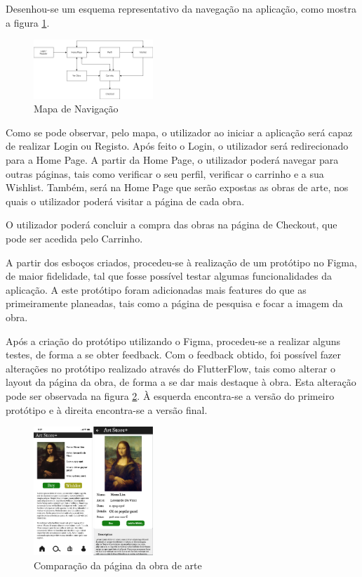 \documentclass[conference]{IEEEtran}
\begin{document}
Desenhou-se um esquema representativo da navegação na aplicação, como mostra a figura \ref{fig:navmap}.

\begin{figure}[ht]
    \centering
    \includegraphics[width=0.4\textwidth]{artstore+map.drawio.png}
    \caption{Mapa de Navigação}
    \label{fig:navmap}
\end{figure}

Como se pode observar, pelo mapa, o utilizador ao iniciar a aplicação será capaz de realizar Login ou Registo. 
Após feito o Login, o utilizador será redirecionado para a Home Page. A partir da Home Page, o utilizador poderá 
navegar para outras páginas, tais como verificar o seu perfil, verificar o carrinho e a sua Wishlist. Também, 
será na Home Page que serão expostas as obras de arte, nos quais o utilizador poderá visitar a página de cada obra. 

O utilizador poderá concluir a compra das obras na página de Checkout, que pode ser acedida pelo Carrinho.

A partir dos esboços criados, procedeu-se à realização de um protótipo no Figma, de maior fidelidade, tal que 
fosse possível testar algumas funcionalidades da aplicação. A este protótipo foram adicionadas mais features do 
que as primeiramente planeadas, tais como a página de pesquisa e focar a imagem da obra.

Após a criação do protótipo utilizando o Figma, procedeu-se a realizar alguns testes, de forma a se obter feedback. 
Com o feedback obtido, foi possível fazer alterações no protótipo realizado através do FlutterFlow, tais como 
alterar o layout da página da obra, de forma a se dar mais destaque à obra. Esta alteração pode ser observada na 
figura \ref{fig:earlyvslate}. À esquerda encontra-se a versão do primeiro protótipo e à direita 
encontra-se a versão final.

\begin{figure}[h]
    \centering
    \includegraphics[width=0.4\textwidth]{artpiece-early-vs-latest.png}
    \caption{Comparação da página da obra de arte}
    \label{fig:earlyvslate}
\end{figure}
\end{document}
